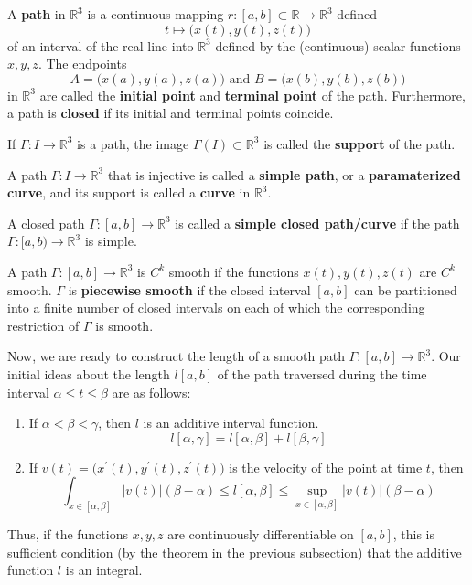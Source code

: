     \begin{definition}[Path]
      A \textbf{path} in $\mathbb{R}^3$ is a continuous mapping $r: [a, b] \subset \mathbb{R} \longrightarrow \mathbb{R}^3$ defined
      \[t \mapsto \big(x(t), y(t), z(t)\big)\]
      of an interval of the real line into $\mathbb{R}^3$ defined by the (continuous) scalar functions $x, y, z$. The endpoints 
      \[A = \big(x(a), y(a), z(a)\big) \text{ and } B = \big(x(b), y(b), z(b)\big)\]
      in $\mathbb{R}^3$ are called the \textbf{initial point} and \textbf{terminal point} of the path. Furthermore, a path is \textbf{closed} if its initial and terminal points coincide. 
    \end{definition}

    \begin{definition}[Support]
      If $\Gamma: I \longrightarrow \mathbb{R}^3$ is a path, the image $\Gamma(I) \subset \mathbb{R}^3$ is called the \textbf{support} of the path. 
    \end{definition}

    \begin{definition}
      A path $\Gamma: I \longrightarrow \mathbb{R}^3$ that is injective is called a \textbf{simple path}, or a \textbf{paramaterized curve}, and its support is called a \textbf{curve} in $\mathbb{R}^3$. 

      A closed path $\Gamma: [a, b] \longrightarrow \mathbb{R}^3$ is called a \textbf{simple closed path/curve} if the path $\Gamma: [a, b) \longrightarrow \mathbb{R}^3$ is simple. 
    \end{definition}

    \begin{definition}
      A path $\Gamma: [a, b] \longrightarrow \mathbb{R}^3$ is $C^k$ smooth if the functions $x(t), y(t), z(t)$ are $C^k$ smooth. $\Gamma$ is \textbf{piecewise smooth} if the closed interval $[a, b]$ can be partitioned into a finite number of closed intervals on each of which the corresponding restriction of $\Gamma$ is smooth. 
    \end{definition}

    Now, we are ready to construct the length of a smooth path $\Gamma: [a, b] \longrightarrow \mathbb{R}^3$. Our initial ideas about the length $l[a, b]$ of the path traversed during the time interval $\alpha \leq t \leq \beta$ are as follows: 
    \begin{enumerate}
      \item If $\alpha < \beta < \gamma$, then $l$ is an additive interval function.
      \[l[\alpha, \gamma] = l[\alpha, \beta] + l[\beta, \gamma]\]
      \item If $v(t) = \big( x^\prime (t), y^\prime (t), z^\prime (t)\big)$ is the velocity of the point at time $t$, then 
      \[\int_{x \in [\alpha, \beta]} |v(t)| (\beta - \alpha) \leq l[\alpha, \beta] \leq \sup_{x \in [\alpha, \beta]} |v(t)| (\beta - \alpha)\]
    \end{enumerate}
    Thus, if the functions $x, y, z$ are continuously differentiable on $[a, b]$, this is sufficient condition (by the theorem in the previous subsection) that the additive function $l$ is an integral.

